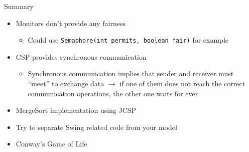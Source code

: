 \begin{frame}{Summary}
  \begin{itemize}
  \item Monitors don't provide any fairness
    \begin{itemize}
    \item Could use \lstinline!Semaphore(int permits, boolean fair)!
      for example
    \end{itemize}
  \item CSP provides synchronous communication
    \begin{itemize}
    \item Synchronous communication implies that sender and receiver
      must ``meet'' to exchange data $\rightarrow$ if one of them does
      not reach the correct communication operations, the other one
      waits for ever
    \end{itemize}
  \item MergeSort implementation using JCSP
  \item Try to separate Swing related code from your model
  \item Conway's Game of Life
  \end{itemize}
\end{frame}


